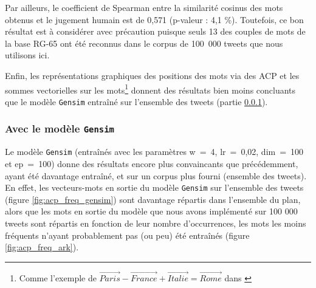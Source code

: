 \documentclass[11pt,french,french]{article}
\let\rmarkdownfootnote\footnote%
\def\footnote{\protect\rmarkdownfootnote}
\begin{document}
Par ailleurs, le coefficient de Spearman entre la similarité cosinus des mots obtenus et le jugement humain est de 0,571 (p-valeur : 4,1 \%). Toutefois, ce bon résultat est à considérer avec précaution puisque seuls 13 des couples de mots de la base RG-65 ont été reconnus dans le corpus de 100~000 tweets que nous utilisons ici.

Enfin, les représentations graphiques des positions des mots via des ACP et les sommes vectorielles sur les mots\footnote{Comme l'exemple de \(\overrightarrow{Paris} - \overrightarrow{France} + \overrightarrow{Italie} = \overrightarrow{Rome}\) dans \cite{Mikolov}} donnent des résultats bien moins concluants que le modèle \texttt{Gensim} entraîné sur l'ensemble des tweets (partie \ref{sec:gensimresultats}).

\hypertarget{sec:gensimresultats}{%
\subsubsection{\texorpdfstring{Avec le modèle \texttt{Gensim}}{Avec le modèle Gensim}}\label{sec:gensimresultats}}

Le modèle \texttt{Gensim} (entraînés avec les paramètres w~=~4, lr~=~0,02, dim~=~100 et ep~=~100) donne des résultats encore plus convaincants que précédemment, ayant été davantage entraîné, et sur un corpus plus fourni (ensemble des tweets).
En effet, les vecteurs-mots en sortie du modèle \texttt{Gensim} sur l'ensemble des tweets (figure \ref{fig:acp_freq_gensim}) sont davantage répartis dans l'ensemble du plan, alors que les mots en sortie du modèle que nous avons implémenté sur 100 000 tweets sont répartis en fonction de leur nombre d'occurrences, les mots les moins fréquents n'ayant probablement pas (ou peu) été entraînés (figure \ref{fig:acp_freq_ark}).
\end{document}
